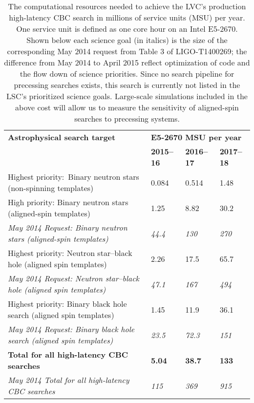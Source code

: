 \begin{table}[!t]
\centering
{\small
\begin{tabular}{|l|l|l|l|}
\hline 
{\bf Astrophysical search target}  & \multicolumn{3}{l|}{\bf E5-2670 MSU per year}\\

{ } &  {\bf 2015--16} & {\bf 2016--17} & {\bf 2017--18}  \\\hline\hline
{ Highest priority:\, Binary neutron stars (non-spinning templates)} & 0.084 & 0.514 & 1.48 \\\hline
{ High priority: Binary neutron stars (aligned-spin templates)} & 1.25 & 8.82 & 30.2 \\\hline
{ \it May 2014 Request: Binary neutron stars (aligned-spin templates)} & \it 44.4 & \it 130 & \it 270 \\\hline\hline
{ Highest priority: Neutron star--black hole (aligned spin templates) } & 2.26 & 17.5 & 65.7 \\\hline
{ \it May 2014 Request: Neutron star--black hole (aligned spin templates) } & \it 47.1 & \it 167 & \it 494 \\\hline\hline
{ Highest priority: Binary black hole search  (aligned spin templates) } & 1.45 & 11.9 & 36.1 \\\hline
{ \it May 2014 Request: Binary black hole search  (aligned spin templates) } & \it 23.5 & \it 72.3 & \it 151 \\\hline\hline
{ \bf Total for all high-latency CBC searches } & \bf 5.04 & \bf 38.7 & \bf 133 \\\hline
{ \it May 2014 Total for all high-latency CBC searches } & \it 115  & \it 369 & \it 915 \\\hline
\end{tabular}
}
\caption{\label{t:offline-xsede-request}
The computational resources needed to achieve the LVC's
production high-latency CBC search in millions of service units (MSU) per
year. One service unit is defined as one core hour on an Intel\textsuperscript{\textregistered} 
E5-2670. 
Shown below each science goal (in italics) is the size of the
corresponding May 2014 request from Table 3 of LIGO-T1400269; the difference from May 2014 to April 2015 reflect optimization of code and the flow down of science priorities. Since no search
pipeline for precessing searches exists, this search is currently not listed
in the LSC's prioritized science goals.  Large-scale simulations included in
the above cost will allow us to measure the sensitivity of aligned-spin
searches to precessing systems.
}
\end{table}

